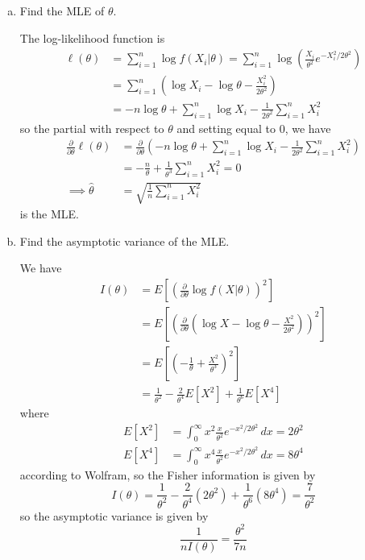 \documentclass{article}
\begin{document}
\begin{itemize}
\begin{enumerate}[a.]
			\item Find the MLE of $\theta.$
				\begin{soln}
					The log-likelihood function is 
					\begin{align*}
						\ell(\theta) &= \sum_{i=1}^{n} \log f(X_i|\theta)=\sum_{i=1}^{n}\log\left( \frac{X_i}{\theta^2}e^{-X_i^2/2\theta^2} \right) \\
						&= \sum_{i=1}^{n} \left( \log X_i - \log \theta - \frac{X_i^2}{2\theta^2} \right) \\
						&= -n\log \theta + \sum_{i=1}^{n} \log X_i - \frac{1}{2\theta^2}\sum_{i=1}^{n} X_i^2
					\end{align*} so the partial with respect to $\theta$ and setting equal to 0, we have
					\begin{align*}
						\frac{\partial}{\partial\theta}\ell(\theta) &= \frac{\partial}{\partial\theta}\left( -n\log \theta + \sum_{i=1}^{n} \log X_i - \frac{1}{2\theta^2}\sum_{i=1}^{n} X_i^2\right) \\
						&= -\frac{n}{\theta} + \frac{1}{\theta^3}\sum_{i=1}^{n}X_i^2 = 0 \\
						\implies \hat{\theta} &= \sqrt{\frac{1}{n}\sum_{i=1}^{n}X_i^2}
					\end{align*} is the MLE.
					
				\end{soln}

			\item Find the asymptotic variance of the MLE.
				\begin{soln}
					We have
					\begin{align*}
						I(\theta) &= E\left[ \left(\frac{\partial}{\partial\theta}\log f(X|\theta)\right)^2 \right] \\
						&= E\left[\left( \frac{\partial}{\partial\theta}\left( \log X-\log \theta-\frac{X^2}{2\theta^2} \right)\right)^2 \right] \\
						&= E\left[ \left(-\frac{1}{\theta}+\frac{X^2}{\theta^3}\right)^2 \right] \\
						&= \frac{1}{\theta^2}-\frac{2}{\theta^4}E[X^2]+\frac{1}{\theta^6}E[X^4]
					\end{align*} where 
					\begin{align*}
						E[X^2] &= \int_0^\infty x^2\frac{x}{\theta^2}e^{-x^2/2\theta^2}\, dx=2\theta^2 \\
						E[X^4] &= \int_0^\infty x^4 \frac{x}{\theta^2}e^{-x^2/2\theta^2}\, dx = 8\theta^4
					\end{align*} according to Wolfram, so the Fisher information is given by \[I(\theta)=\frac{1}{\theta^2}-\frac{2}{\theta^4}(2\theta^2)+\frac{1}{\theta^6}(8\theta^4)=\frac{7}{\theta^2}\] so the asymptotic variance is given by \[\frac{1}{nI(\theta)}=\frac{\theta^2}{7n}\]
					

\end{soln}
\end{enumerate}
\end{itemize}
\end{document}
